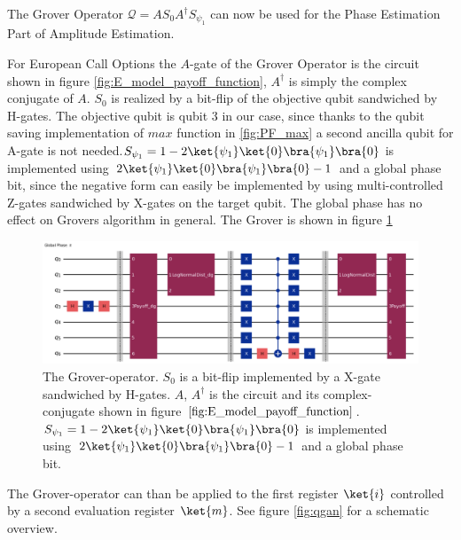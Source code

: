 \documentclass[../main.tex]{subfiles}
\begin{document}
The Grover Operator $\mathcal{Q}=AS_0A^\dagger S_{\psi_1}$ can now be used for the Phase Estimation Part of Amplitude Estimation. 

For European Call Options the $A$-gate of the Grover Operator is the circuit shown in figure \ref{fig:E_model_payoff_function}, $A^{\dagger}$ is simply the complex conjugate of $A$. $S_0$ is realized by a bit-flip of the objective qubit sandwiched by H-gates. The objective qubit is qubit 3 in our case, since thanks to the qubit saving implementation of $max$ function in 
\ref{fig:PF_max} a second ancilla qubit for A-gate is not needed.$S_{\psi_1} = 1-2\ket{\psi_1}\ket{0}\bra{\psi_1}\bra{0}$ is implemented using $2\ket{\psi_1}\ket{0}\bra{\psi_1}\bra{0}-1$
and a global phase bit, since the negative form can easily be implemented by using multi-controlled Z-gates sandwiched by X-gates on the target qubit. The global phase has no effect on Grovers algorithm in general. The Grover is shown in figure \ref{fig:grover}

 \begin{figure}[H]
  \begin{center}
    \includegraphics[width=\linewidth]{../../images/grover.png}
  \end{center}
  \caption{The Grover-operator. $S_0$ is a bit-flip implemented by a X-gate sandwiched by H-gates. $A$, $A^{\dagger}$ is the circuit and its complex-conjugate shown in figure $\ref{fig:E_model_payoff_function}$.\\
  $S_{\psi_1} = 1-2\ket{\psi_1}\ket{0}\bra{\psi_1}\bra{0}$ is implemented using $2\ket{\psi_1}\ket{0}\bra{\psi_1}\bra{0}-1$ and a global phase bit.}
  \label{fig:grover}
\end{figure}

The Grover-operator can than be applied to the first register $\ket{i}$ controlled by a second evaluation register $\ket{m}$. See figure \ref{fig:qgan} for a schematic overview.
\end{document}
